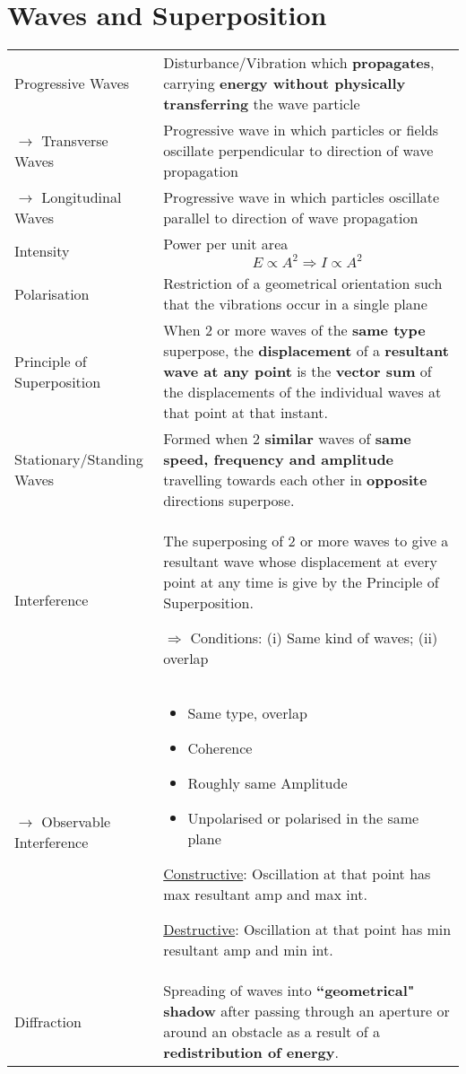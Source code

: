 \documentclass[a4paper]{article}
\begin{document}
	\section{Waves and Superposition}
	\begin{center}
		\renewcommand{\arraystretch}{1.3}
		\begin{tabular}{@{} l p{9cm} @{}}
			\toprule
			Progressive Waves & Disturbance/Vibration which \textbf{propagates}, carrying \textbf{energy without physically transferring} the wave particle \\
			$\rightarrow$ Transverse Waves & Progressive wave in which particles or fields oscillate perpendicular to direction of wave propagation \\ 
			$\rightarrow$ Longitudinal Waves & Progressive wave in which particles oscillate parallel to direction of wave propagation \\
			Intensity & Power per unit area $$E \propto A^2 \Rightarrow I \propto A^2$$ \vspace*{-\baselineskip}\\
			Polarisation & Restriction of a geometrical orientation such that the vibrations occur in a single plane \\ 
			Principle of Superposition & When 2 or more waves of the \textbf{same type} superpose, the \textbf{displacement} of a \textbf{resultant wave at any point} is the \textbf{vector sum} of the displacements of the individual waves at that point at that instant.\\
			Stationary/Standing Waves & Formed when 2 \textbf{similar} waves of \textbf{same speed, frequency and amplitude} travelling towards each other in \textbf{opposite} directions superpose. \\
			Interference & The superposing of 2 or more waves to give a resultant wave whose displacement at every point at any time is give by the Principle of Superposition. \par $\Rightarrow$ Conditions: (i) Same kind of waves; (ii) overlap\\
			$\rightarrow$ Observable Interference & 
			\begin{minipage}[t]{\textwidth}%
				\begin{itemize}
					\item Same type, overlap
					\item Coherence 
					\item Roughly same Amplitude 
					\item Unpolarised or polarised in the same plane 
				\end{itemize}
			\end{minipage} \par 
			\underline{Constructive}: Oscillation at that point has max resultant amp and max int.\par
			\underline{Destructive}: Oscillation at that point has min resultant amp and min int.\\
			Diffraction & Spreading of waves into \textbf{``geometrical" shadow} after passing through an aperture or around an obstacle as a result of a \textbf{redistribution of energy}. \\
			\bottomrule
		\end{tabular}
	\end{center}
	\newpage
\end{document}

